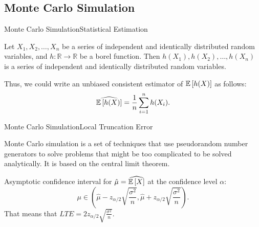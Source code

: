 \subsection{Monte Carlo Simulation}
    \begin{frame}{Monte Carlo Simulation}{Statistical Estimation}
        \begin{lemma}
            Let $X_1, X_2, \dots, X_n$ be a series of independent and identically distributed random variables, and $h: \mathbb{R} \to \mathbb{R}$ be a borel function. Then $h(X_1), h(X_2), \dots, h(X_n)$ is a series of independent and identically distributed random variables.
        \end{lemma}
        Thus, we could write an unbiased consistent estimator of $\mathbb{E} \left[h(X)\right]$ as follows:
        \begin{equation}
            \widehat{\mathbb{E} \left[h(X)\right]} = \frac{1}{n} \sum_{i=1}^n h(X_i).
        \end{equation}
    \end{frame}

    \begin{frame}{Monte Carlo Simulation}{Local Truncation Error}
        \begin{definition}
            Monte Carlo simulation is a set of techniques that use pseudorandom number generators to solve problems that might be too complicated to be solved analytically. It is based on the central limit theorem.
        \end{definition}
        Asymptotic confidence interval for $\hat{\mu} = \widehat{\mathbb{E}\left[X\right]}$ at the confidence level $\alpha$:
        \begin{equation}
            \mu \in \left(\hat{\mu} - z_{\alpha/2} \sqrt{\frac{\sigma^2}{n}}, \hat{\mu} + z_{\alpha/2} \sqrt{\frac{\sigma^2}{n}}\right).
        \end{equation}
        That means that $LTE = 2z_{\alpha/2} \sqrt{\frac{\sigma^2}{n}}$.
    \end{frame}